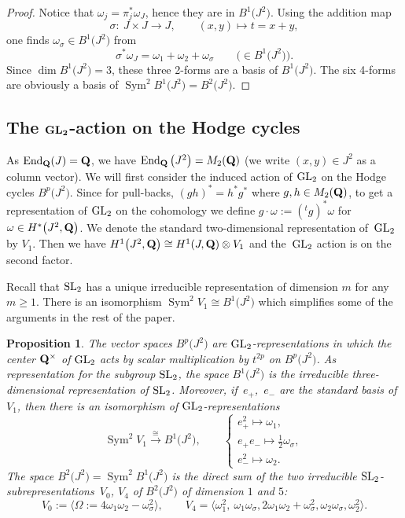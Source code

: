 \documentclass[pdftex]{sigma}
\numberwithin{equation}{section}
\newtheorem{Proposition}[Theorem]{Proposition}
 { \theoremstyle{definition}
\newtheorem{Definition}[Theorem]{Definition}
\newtheorem{Note}[Theorem]{Note}
\newtheorem{Example}[Theorem]{Example}
\newtheorem{Remark}[Theorem]{Remark} }
\begin{document}
\begin{proof}
Notice that $\omega_j=\pi_j^*\omega_J$, hence they are in $B^1\big(J^2\big)$. Using the addition map
\[
\sigma \colon \ J\times J \longrightarrow J,\qquad
(x,y)\longmapsto t=x+y,
\]
one finds $\omega_\sigma\in B^1\big(J^2\big)$ from
\[
\sigma^*\omega_J =
\omega_1+\omega_2+\omega_\sigma\qquad\big(\!\!\in B^1\big(J^2\big)\big).
\]
Since $\dim B^1\big(J^2\big)=3$, these three 2-forms are a basis of $B^1\big(J^2\big)$.
The six 4-forms are obviously a basis of $\operatorname{Sym}^2B^1\big(J^2\big)= B^2\big(J^2\big)$.
\end{proof}

\subsection[The GL\_2-action on the Hodge cycles]{The $\boldsymbol{{\rm GL}_2}$-action on the Hodge cycles}\label{GL2Hodge}

As $\operatorname{End}_{\bf Q}(J)={\bf Q}$, we have $\operatorname{End}_{\bf Q}\big(J^2\big)=M_2({\bf Q})$ (we write $(x,y)\in J^2$ as
a column vector).
We will first consider the induced action of ${\rm GL}_2$ on the Hodge cycles $B^p\big(J^2\big)$.
Since for pull-backs, $(gh)^*=h^*g^*$ where $g,h\in M_2({\bf Q})$, to get a representation
of ${\rm GL}_2$ on the cohomology we define
$g\cdot \omega:=({}^tg)^*\omega$ for $\omega\in H^*\big(J^2,{\bf Q}\big)$.
We denote the standard two-dimensional representation of~${\rm GL}_2$ by $V_1$. Then we
have $H^1\big(J^2,{\bf Q}\big)\cong H^1(J,{\bf Q})\otimes V_1$ and the~${\rm GL}_2$ action is on the second factor.

Recall that ${\rm SL}_2$ has a unique irreducible representation of dimension $m$ for any
$m\geq 1$. There is an isomorphism $\operatorname{Sym}^2V_1\cong B^1\big(J^2\big)$ which simplifies some of the arguments in
the rest of the paper.

\begin{Proposition} \label{GLB}\label{decGLB}
The vector spaces $B^p\big(J^2\big)$ are ${\rm GL}_2$-representations
in which the center ${\bf Q}^\times$ of ${\rm GL}_2$ acts by
scalar multiplication by $t^{2p}$ on $B^p\big(J^2\big)$.
As representation for the subgroup ${\rm SL}_2$,
the space $B^1\big(J^2\big)$ is the irreducible three-dimensional
representation of ${\rm SL}_2$. Moreover, if~$e_+$,~$e_-$ are the standard basis of $V_1$, then there
is an isomorphism of ${\rm GL}_2$-representations
\[
\operatorname{Sym}^2V_1 \stackrel{\cong}{\longrightarrow} B^1\big(J^2\big),
\qquad \begin{cases} e_+^2 \longmapsto \omega_1,\\
 e_+e_- \longmapsto \tfrac{1}{2}\omega_\sigma,\\
 e_-^2 \longmapsto \omega_2.
 \end{cases}
\]
The space $B^2\big(J^2\big)=\operatorname{Sym}^2B^1\big(J^2\big)$ is the direct sum of
the two irreducible ${\rm SL}_2$-subrepresen\-ta\-tions~$V_0$, $V_4$ of $B^2\big(J^2\big)$
of dimension $1$ and $5$:
\[
V_0 := \big\langle \Omega := 4\omega_1\omega_2 - \omega_\sigma^2 \big\rangle,
\qquad
V_4 =
\big\langle \omega_1^2,\ \omega_1\omega_\sigma,
2\omega_1\omega_2+\omega_\sigma^2,
\omega_2\omega_\sigma, \omega_2^2 \big\rangle.
\]
\end{Proposition}
\end{document}
